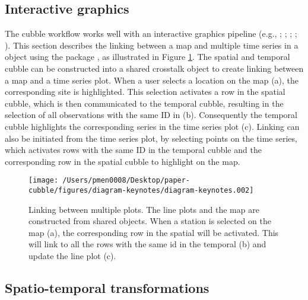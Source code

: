\documentclass[
  shortnames]{jss}
\begin{document}
\hypertarget{interactive-graphics}{%
\subsection{Interactive graphics}\label{interactive-graphics}}

The cubble workflow works well with an interactive graphics pipeline (e.g., \citet{buja1988elements}; \citet{buja1996interactive}; \citet{sutherland2000orca}; \citet{xie2014reactive}; \citet{cheng2016enabling}). This section describes the linking between a map and multiple time series in a  object using the package  \citep{crosstalk}, as illustrated in Figure \ref{fig:illu-interactive}. The spatial and temporal cubble can be constructed into a shared crosstalk object to create linking between a map and a time series plot. When a user selects a location on the map (a), the corresponding site is highlighted. This selection activates a row in the spatial cubble, which is then communicated to the temporal cubble, resulting in the selection of all observations with the same ID in (b). Consequently the temporal cubble highlights the corresponding series in the time series plot (c). Linking can also be initiated from the time series plot, by selecting points on the time series, which activates rows with the same ID in the temporal cubble and the corresponding row in the spatial cubble to highlight on the map.

\begin{CodeChunk}
\begin{figure}

{\centering \texttt{[image: /Users/pmen0008/Desktop/paper-cubble/figures/diagram-keynotes/‎diagram-keynotes.‎002]} 

}

\caption{Linking between multiple plots. The line plots and the map are constructed from shared  objects. When a station is selected on the map (a), the corresponding row in the spatial  will be activated. This will link to all the rows with the same id in the temporal  (b) and update the line plot (c).}\label{fig:illu-interactive}
\end{figure}
\end{CodeChunk}

\hypertarget{st_transformation}{%
\subsection{Spatio-temporal transformations}\label{st_transformation}}
\end{document}
